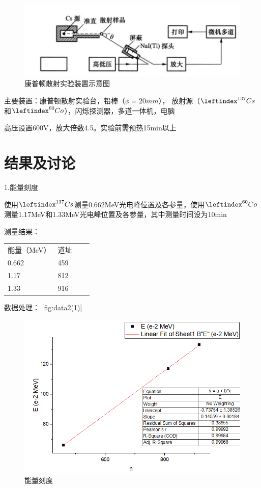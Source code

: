 \documentclass[font=default]{mpltx}
\begin{document}
\begin{figure}
  \centering
  \includegraphics[width=0.85\linewidth]{fig/instrument2.jpg}
  \caption{康普顿散射实验装置示意图}
  \label{sec:instrument2}
\end{figure}

主要装置：康普顿散射实验台，铅棒（$\phi = 20 mm$），
放射源（$ \leftindex^{137} {Cs}$和$ \leftindex^{60} {Co}$），闪烁探测器，多道一体机，电脑

高压设置600V，放大倍数4.5。实验前需预热15min以上

\section{结果及讨论}
1.能量刻度

使用$ \leftindex^{137} {Cs}$测量0.662MeV光电峰位置及各参量，使用$ \leftindex^{60} {Co}$测量1.17MeV和1.33MeV光电峰位置及各参量，其中测量时间设为10min

测量结果：

\begin{table}[]
\begin{tabular}{llll}
能量（MeV）                & 道址                  \\
0.662                     & 459                    \\
1.17                      & 812                    \\
1.33                      & 916                     \\
\end{tabular}
\end{table}

数据处理： \autoref{fig:data2(1)}

\begin{figure}
  \centering
  \includegraphics[width=0.85\linewidth]{fig/data2(1).png}
  \caption{能量刻度}
  \label{sec:data2(1)}
\end{figure}
\end{document}
